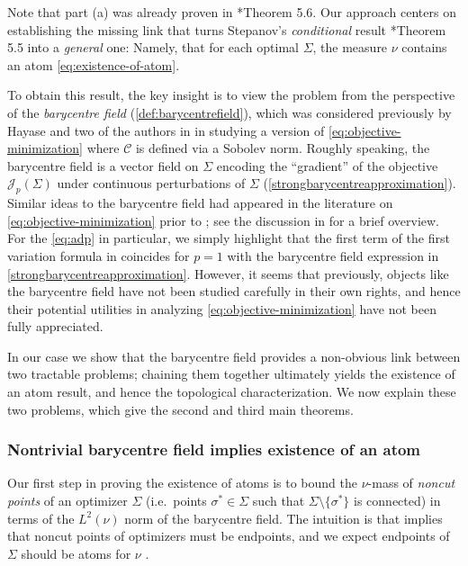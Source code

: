 \documentclass[preprint, reqno]{amsart}
\theoremstyle{definition}
\numberwithin{equation}{section}
\begin{document}
Note that part (a) was already proven in \cite{Stepanov04}*{Theorem 5.6}.
Our approach centers on establishing the missing link that turns
Stepanov's \emph{conditional} result \cite{Stepanov06}*{Theorem 5.5}
into a \emph{general} one: Namely, that for each optimal $\Sigma$, the
measure $\nu$ contains an atom \eqref{eq:existence-of-atom}.

To obtain this result, the key insight is to view the problem from the
perspective of the \emph{barycentre field}
(\cref{def:barycentrefield}), which was considered previously by
Hayase and two of the authors in \cite{Kobayashi24} in studying a
version of \eqref{eq:objective-minimization} where $\mathscr C$ is
defined via a Sobolev norm. Roughly speaking, the barycentre field is
a vector field on $\Sigma$ encoding the ``gradient'' of the objective
$\mathscr J_p(\Sigma)$ under continuous perturbations of $\Sigma$
(\cref{strongbarycentreapproximation}). Similar ideas to the
barycentre field had appeared in the literature on
\eqref{eq:objective-minimization} prior to \cite{Kobayashi24}; see the
discussion in \cite[\S 4.1]{Kobayashi24} for a brief overview. For the
\eqref{eq:adp} in particular, we simply highlight that the first term
of the first variation formula in \cite[Theorem\ 2.2]{Buttazzo09}
coincides for $p=1$ with the barycentre field expression in
\cref{strongbarycentreapproximation}. However, it seems that
previously, objects like the barycentre field have not been studied
carefully in their own rights, and hence their potential utilities in
analyzing \eqref{eq:objective-minimization} have not been fully
appreciated.

In our case we show that the barycentre field provides a non-obvious
link between two tractable problems; chaining them together ultimately
yields the existence of an atom result, and hence the topological
characterization. We now explain these two problems, which give the
second and third main theorems.

\subsubsection{Nontrivial barycentre field implies existence of an
  atom} \label{sec:nontrivial-bary-existence-of-atom}

Our first step in proving the existence of atoms is to bound the
$\nu$-mass of \textit{noncut points} of an optimizer $\Sigma$ (i.e.\
points $\sigma^* \in \Sigma$ such that $\Sigma \setminus \{\sigma^*\}$
is connected) in terms of the $L^2(\nu)$ norm of the barycentre field.
The intuition is that \cite[Theorem 5.6]{Stepanov04} implies that
noncut points of optimizers must be endpoints, and we expect endpoints
of $\Sigma$ should be atoms for $\nu$ \cite[Discussion following Lemma
7]{Lemenant12}.
\end{document}
